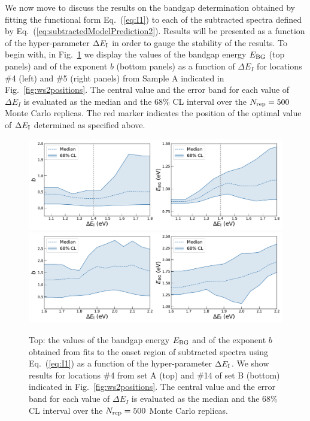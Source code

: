 We now move to discuss the results on the bandgap determination obtained
by fitting the functional form Eq.~(\ref{eq:I1}) to each of the subtracted
spectra defined by Eq.~(\ref{eq:subtractedModelPrediction2}).
%
Results will be presented as a function of the hyper-parameter $\Delta E_{\rm I}$
in order to gauge the stability of the results.
%
To begin with, in Fig.~\ref{fig:bvalues}
we display the values of the bandgap energy $E_{\rm BG}$ (top panels)
and of the exponent $b$ (bottom panels) as a function of $\Delta E_I$
for locations \#4 (left)
and \#5 (right panels) from Sample A indicated in Fig.~\ref{fig:ws2positions}.
%
The central value and the error band for each value of $\Delta E_I$ is evaluated
as the median and the 68\% CL interval over the $N_{\rm rep}=500$ Monte Carlo replicas.
%
The red marker indicates the position of the optimal value of
$\Delta E_{\rm I}$ determined as specified above.


\begin{figure}[t]
\begin{centering}
  \includegraphics[width=0.6\linewidth]{plots/Stability_plots_sp4.pdf}
  \includegraphics[width=0.6\linewidth]{plots/Stability_plots_sp14.pdf} 
  \caption{Top: the values of the bandgap energy $E_{\rm BG}$ and of the exponent $b$
  obtained from fits to the onset
  region of subtracted spectra using Eq.~(\ref{eq:I1}) as a function
  of the hyper-parameter $\Delta E_{\rm I}$.
  We show results for locations \#4 from set A (top)
  and \#14 of set B (bottom) indicated in Fig.~\ref{fig:ws2positions}.
  The central value and the error band for each value of $\Delta E_I$ is evaluated
  as the median and the 68\% CL interval over the $N_{\rm rep}=500$ Monte Carlo replicas.
  }
\label{fig:bvalues}
\end{centering}
\end{figure}

